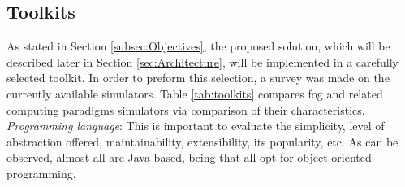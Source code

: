 \subsection{Toolkits}
\label{sec:Toolkits}
\noindent As stated in Section \ref{subsec:Objectives}, the proposed solution, which will be described later in Section \ref{sec:Architecture}, will be implemented in a carefully selected toolkit. In order to preform this selection, a survey was made on the currently available simulators. Table \ref{tab:toolkits} compares fog and related computing paradigms simulators via comparison of their characteristics.\\
\noindent\tab \textit{Programming language}: This is important to evaluate the simplicity, level of abstraction offered, maintainability, extensibility, its popularity, etc. As can be observed, almost all are Java-based, being that all opt for object-oriented programming.\\
